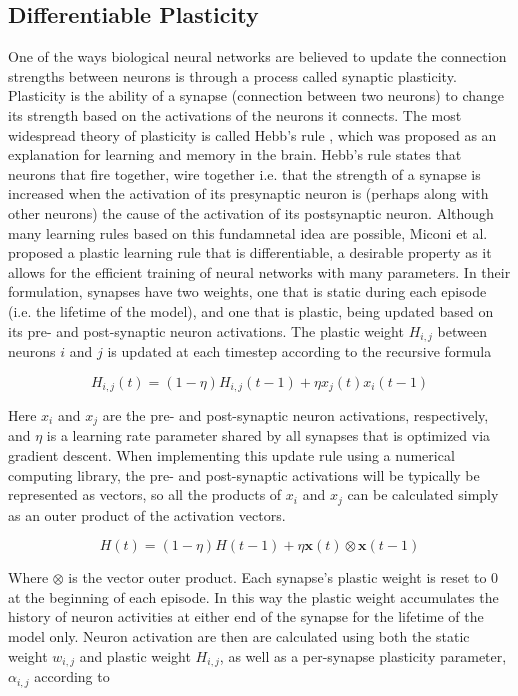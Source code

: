 \subsection*{Differentiable Plasticity}

One of the ways biological neural networks are believed to update the connection strengths between neurons is through a process called synaptic plasticity. Plasticity is the ability of a synapse (connection between two neurons) to change its strength based on the activations of the neurons it connects. The most widespread theory of plasticity is called Hebb's rule \cite{hebb1949rule}, which was proposed as an explanation for learning and memory in the brain. Hebb's rule states that neurons that fire together, wire together i.e. that the strength of a synapse is increased when the activation of its presynaptic neuron is (perhaps along with other neurons) the cause of the activation of its postsynaptic neuron. Although many learning rules based on this fundamnetal idea are possible, Miconi et al.\cite{miconi2018diffplas} proposed a plastic learning rule that is differentiable, a desirable property as it allows for the efficient training of neural networks with many parameters. In their formulation, synapses have two weights, one that is static during each episode (i.e. the lifetime of the model), and one that is plastic, being updated based on its pre- and post-synaptic neuron activations. The plastic weight \(H_{i,j}\) between neurons \(i\) and \(j\) is updated at each timestep according to the recursive formula

\[ H_{i,j}(t) = (1-\eta)H_{i,j}(t-1) + \eta x_j(t)x_i(t-1) \] 

Here \(x_i\) and \(x_j\) are the pre- and post-synaptic neuron activations, respectively, and \(\eta\) is a learning rate parameter shared by all synapses that is optimized via gradient descent. When implementing this update rule using a numerical computing library, the pre- and post-synaptic activations will be typically be represented as vectors, so all the products of \(x_i\) and \(x_j\) can be calculated simply as an outer product of the activation vectors.

\[ H(t) = (1-\eta)H(t-1) + \eta \mathbf{x}(t) \otimes \mathbf{x}(t-1) \]

Where \(\otimes\) is the vector outer product. Each synapse's plastic weight is reset to 0 at the beginning of each episode. In this way the plastic weight accumulates the history of neuron activities at either end of the synapse for the lifetime of the model only. Neuron activation are then are calculated using both the static weight \(w_{i,j}\) and plastic weight \(H_{i,j}\), as well as a per-synapse plasticity parameter, \(\alpha_{i,j}\) according to

